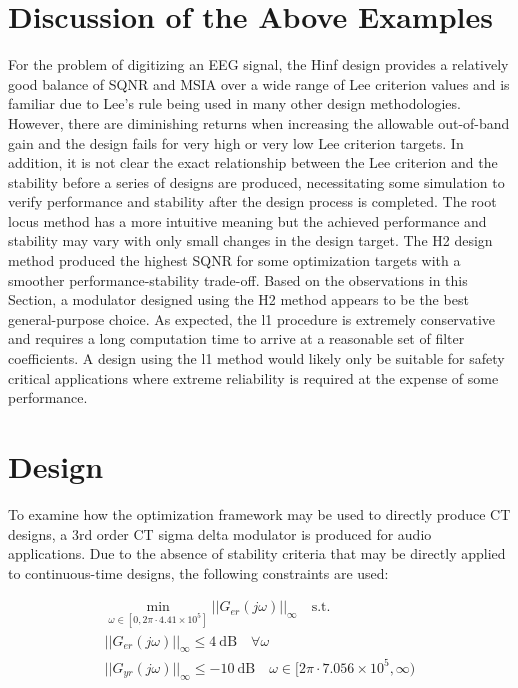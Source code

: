 \section{Discussion of the Above Examples}
For the problem of digitizing an \gls{EEG} signal, the \gls{Hinf} design provides a relatively good balance of \gls{SQNR} and \gls{MSIA} over a wide range of Lee criterion values and is familiar due to Lee's rule being used in many other design methodologies. However, there are diminishing returns when increasing the allowable out-of-band gain and the design fails for very high or very low Lee criterion targets. In addition, it is not clear the exact relationship between the Lee criterion and the stability before a series of designs are produced, necessitating some simulation to verify performance and stability after the design process is completed. The root locus method has a more intuitive meaning but the achieved performance and stability may vary with only small changes in the design target. The \gls{H2} design method produced the highest \gls{SQNR} for some optimization targets with a smoother performance-stability trade-off. Based on the observations in this Section, a modulator designed using the \gls{H2} method appears to be the best general-purpose choice. As expected, the \gls{l1} procedure is extremely conservative and requires a long computation time to arrive at a reasonable set of filter coefficients. A design using the \gls{l1} method would likely only be suitable for safety critical applications where extreme reliability is required at the expense of some performance.

\section{ Design}
\label{sec:ex-ct}

To examine how the optimization framework may be used to directly produce \gls{CT} designs, a 3rd order \gls{CT} sigma delta modulator is produced for audio applications. Due to the absence of stability criteria that may be directly applied to continuous-time designs, the following constraints are used:

\begin{gather}
	\min_{\omega \in [0, 2\pi\cdot4.41\times10^5]} ||G_{er}(j\omega)||_\infty \quad \textrm{s.t.} \label{eq:ct-con1} \\
	||G_{er}(j\omega)||_\infty \leq \SI{4}{\deci\bel} \quad \forall \omega \label{eq:ct-con2} \\
	||G_{yr}(j\omega)||_\infty \leq \SI{-10}{\deci\bel} \quad \omega \in [2\pi\cdot7.056\times10^5, \infty) \label{eq:ct-con3}
\end{gather}

